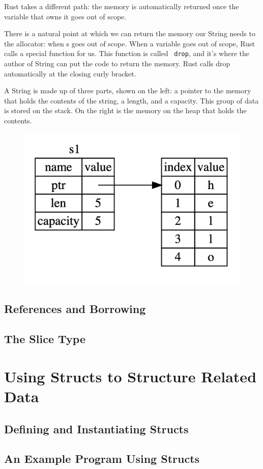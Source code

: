 \documentclass[11pt]{article}
\let\OldTexttt\texttt
\renewcommand{\texttt}[1]{\OldTexttt{\color{MidnightBlue} #1}}
\begin{document}
Rust takes a different path: the memory is automatically returned once the variable that owns
it goes out of scope.

There is a natural point at which we can return the memory our String needs to the allocator:
when s goes out of scope. When a variable goes out of scope, Rust calls a special function for
us. This function is called \texttt{drop}, and it’s where the author of String can put the code to
return the memory. Rust calls drop automatically at the closing curly bracket.

A String is made up of three parts, shown on the left: a pointer to the memory that holds the
contents of the string, a length, and a capacity. This group of data is stored on the stack.
On the right is the memory on the heap that holds the contents.

\begin{figure}[htbp]
\centering
\includegraphics[width=.7\textwidth]{../images/TheRustBook/1.png}
\label{}
\end{figure}

\subsection{References and Borrowing}
\label{sec:orgcfe4829}
\subsection{The Slice Type}
\label{sec:org320002b}
\section{Using Structs to Structure Related Data}
\label{sec:orgdf110ab}
\subsection{Defining and Instantiating Structs}
\label{sec:orgf1f6be2}
\subsection{An Example Program Using Structs}
\label{sec:org67e7ee8}
\end{document}
